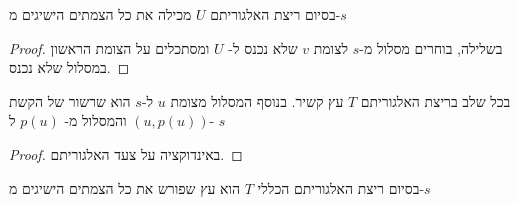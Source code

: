 \begin{claim}
בסיום ריצת האלגוריתם
$U$
מכילה את כל הצמתים הישיגים מ-$s$
\end{claim}
\begin{proof}
בשלילה, בוחרים מסלול מ-$s$ לצומת $v$ שלא נכנס ל-%
$U$
ומסתכלים על הצומת הראשון במסלול שלא נכנס.
\end{proof}
\begin{claim}
בכל שלב בריצת האלגוריתם
$T$
עץ קשיר.
בנוסף המסלול מצומת $u$ ל-$s$ הוא שרשור של הקשת 
$(u, p(u))$
והמסלול מ-%
$p(u)$
ל-%
$s$
\end{claim}
\begin{proof}
באינדוקציה על צעד האלגוריתם.
\end{proof}
\begin{theorem}
בסיום ריצת האלגוריתם הכללי $T$ הוא עץ שפורש את כל הצמתים הישיגים מ-$s$
\end{theorem}







